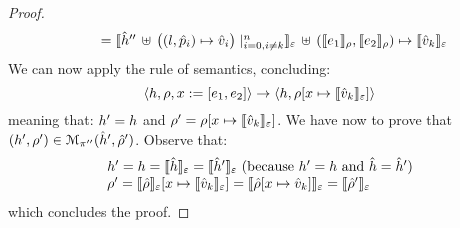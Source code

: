 \begin{proof}
$$\begin{array}{l}
         \qquad =  \semexpr{\sheap'' \, \uplus \, \big((l, \sexprp_i) \mapsto \sexprv_i\big)\mid_{i = 0, i \neq k}^n}{\senv} \dunion (\symbeval{\jsilexpr_1}{\store}, \symbeval{\jsilexpr_2}{\store}) \mapsto \semexpr{\sexprv_k}{\senv}
\end{array}
$$
We can now apply the  rule of \jsil semantics, concluding: 
$$
   \semtrans{\heap, \store, \jvar := [\jsilexpr_1, \jsilexpr_2]}{\heap,  \store[\jvar \mapsto \semexpr{\sexprv_k}{\senv}]}
$$
meaning that: $\heap' = \heap$ and $\store' = \store[\jvar \mapsto \semexpr{\sexprv_k}{\senv}]$.
We have now to prove that $(\heap', \store') \in \smodels{\sheap', \sstore'}{\pc''}$.
Observe that: 
$$
\begin{array}{l}
\heap' = \heap = \semexpr{\sheap}{\senv}   = \semexpr{\sheap'}{\senv}  \text{ (because $\heap' = \heap$ and $ \sheap = \sheap'$)}
\\
 \store' =  \semexpr{\sstore}{\senv}[\jvar \mapsto \symbeval{\sexprv_k}{\senv}] 
    =  \semexpr{\sstore[\jvar \mapsto \sexprv_k]}{\senv} 
    =  \semexpr{\sstore'}{\senv}
\end{array}
$$
 which concludes the proof. 
\vspace{6pt}


\end{proof}
